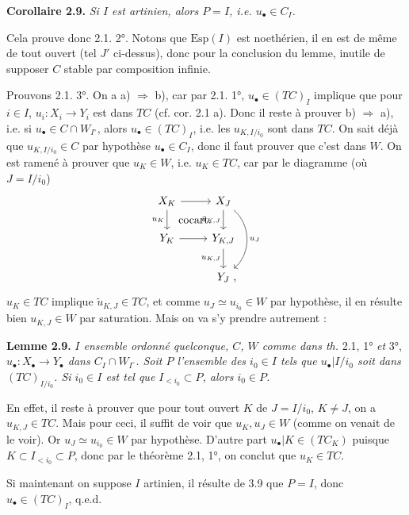 \documentclass[11pt]{article}
\newcommand{\printedpage}[1]{\marginpar{\footnotesize p.~#1}}
\newcommand{\msp}[1]{\marginpar{\footnotesize [#1]}}
\begin{document}
\noindent\textbf{Corollaire 2.9.} \textit{Si $I$ est artinien, alors $P = I$, i.e. $u_\bullet \in C_I$.}

Cela prouve donc 2.1. 2°. Notons que $\mathrm{Esp}(I)$ est noethérien, il en est de même de tout ouvert (tel $J'$ ci-dessus), donc \msp{36} pour la conclusion du lemme, inutile de supposer $C$ stable par composition infinie.

\printedpage{20}

Prouvons 2.1. 3°. On a a) $\Longrightarrow$ b), car par 2.1. 1°, $u_\bullet \in (TC)_I$ implique que pour $i \in I$, $u_i : X_i \longrightarrow Y_i$ est dans $TC$ (cf. cor. 2.1 a). Donc il reste à prouver b) $\Longrightarrow$ a), i.e. si $u_\bullet \in C \cap W_{I^\circ}$, alors $u_\bullet \in (TC)_I$, i.e. les $u_{K,I/i_0}$ sont dans $TC$. On sait déjà que $u_{K,I/i_0} \in C$ par hypothèse $u_\bullet \in C_I$, donc il faut prouver que c'est dans $W$. On est ramené à prouver que $u_K \in W$, i.e. $u_K \in TC$, car par le diagramme (où $J = I/i_0$)
\[
\begin{tikzcd}
X_K \arrow[r] \arrow[d, "u_K"'] \arrow[dr, phantom, "\text{cocart.}"] & X_J \arrow[d, "\tilde{u}_{K,J}"'] \arrow[dd, bend left=50, "u_J"] \\
Y_K \arrow[r] & Y_{K,J} \arrow[d, "u_{K,J}"'] \\
& Y_J \rlap{\ ,}
\end{tikzcd}
\]
$u_K \in TC$ implique $\tilde{u}_{K,J} \in TC$, et comme $u_J \simeq u_{i_0} \in W$ par hypothèse, il en résulte bien $u_{K,J} \in W$ par saturation. Mais on va s'y prendre autrement :

\msp{37}

\noindent\textbf{Lemme 2.9.} \textit{$I$ ensemble ordonné quelconque, $C$, $W$ comme dans th.} 2.1, 1° \textit{et} 3°, \textit{$u_\bullet : X_\bullet \longrightarrow Y_\bullet$ dans $C_I \cap W_{I^\circ}$. Soit $P$ l'ensemble des $i_0 \in I$ tels que $u_\bullet|I/i_0$ soit dans $(TC)_{I/i_0}$. Si $i_0 \in I$ est tel que $I_{<i_0} \subset P$, alors $i_0 \in P$.}

En effet, il reste à prouver que pour tout ouvert $K$ de $J = I/i_0$, $K \neq J$, on a $u_{K,J} \in TC$. Mais pour ceci, il suffit de voir que $u_K, u_J \in W$ (comme on venait de le voir). Or $u_J \simeq u_{i_0} \in W$ par hypothèse. D'autre part $u_\bullet|K \in (TC_K)$ puisque $K \subset I_{<i_0} \subset P$, donc par le théorème 2.1, 1°, on conclut que $u_K \in TC$.

Si maintenant on suppose $I$ artinien, il résulte de 3.9 que $P = I$, donc $u_\bullet \in (TC)_I$, q.e.d. %
\end{document}
